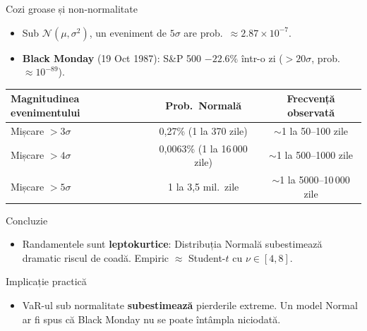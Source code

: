 \documentclass[9pt, aspectratio=169, t]{beamer}
\theoremstyle{definition}
\begin{document}
\begin{frame}[shrink=10]{Cozi groase și non-normalitate}
\begin{itemize}\footnotesize\setlength{\itemsep}{0pt}
    \item Sub $\mathcal{N}(\mu,\sigma^2)$, un eveniment de $5\sigma$ are prob.\ $\approx 2.87 \times 10^{-7}$.
    \item \textbf{Black Monday} (19 Oct 1987): S\&P 500 $-22.6\%$ într-o zi ($>20\sigma$, prob.\ $\approx 10^{-89}$).
\end{itemize}
\vspace{0.05cm}
\begin{center}
{\footnotesize
\renewcommand{\arraystretch}{1.05}
\begin{tabular}{lcc}
\toprule
\textbf{Magnitudinea evenimentului} & \textbf{Prob.\ Normală} & \textbf{Frecvență observată} \\
\midrule
Mișcare $> 3\sigma$ & 0,27\% (1 la 370 zile) & $\sim$1 la 50--100 zile \\
Mișcare $> 4\sigma$ & 0,0063\% (1 la 16\,000 zile) & $\sim$1 la 500--1000 zile \\
Mișcare $> 5\sigma$ & 1 la 3,5 mil.\ zile & $\sim$1 la 5000--10\,000 zile \\
\bottomrule
\end{tabular}
}
\end{center}
\vspace{0.05cm}
\begin{alertblock}{Concluzie}
\begin{itemize}\small\setlength{\itemsep}{0pt}
    \item Randamentele sunt \textbf{leptokurtice}: Distribuția Normală subestimează dramatic riscul de coadă. Empiric $\approx$ Student-$t$ cu $\nu \in [4,8]$.
\end{itemize}
\end{alertblock}
\begin{exampleblock}{Implicație practică}
\begin{itemize}\small\setlength{\itemsep}{0pt}
    \item VaR-ul sub normalitate \textbf{subestimează} pierderile extreme. Un model Normal ar fi spus că Black Monday nu se poate întâmpla niciodată.
\end{itemize}
\end{exampleblock}
\end{frame}
\end{document}
